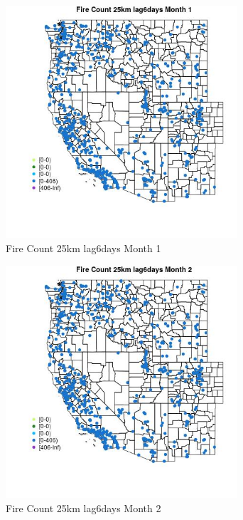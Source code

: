 \begin{figure} 
\centering  
\includegraphics[width=0.77\textwidth]{Code_Outputs/Report_ML_input_PM25_Step4_part_f_de_duplicated_aveswNAs_MapObsMo1Fire_Count_25km_lag6days.jpg} 
\caption{\label{fig:Report_ML_input_PM25_Step4_part_f_de_duplicated_aveswNAsMapObsMo1Fire_Count_25km_lag6days}Fire Count 25km lag6days Month 1} 
\end{figure} 
 

\begin{figure} 
\centering  
\includegraphics[width=0.77\textwidth]{Code_Outputs/Report_ML_input_PM25_Step4_part_f_de_duplicated_aveswNAs_MapObsMo2Fire_Count_25km_lag6days.jpg} 
\caption{\label{fig:Report_ML_input_PM25_Step4_part_f_de_duplicated_aveswNAsMapObsMo2Fire_Count_25km_lag6days}Fire Count 25km lag6days Month 2} 
\end{figure} 
 

